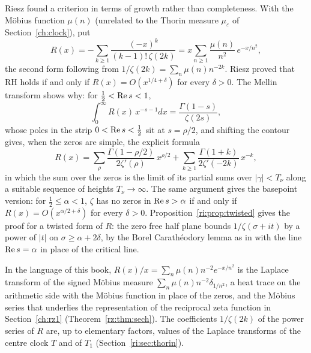 Riesz \cite{Riesz16} found a criterion in terms of growth rather than completeness. With the M\"obius function $\mu(n)$ (unrelated to the Thorin measure $\mu_\varepsilon$ of Section~\ref{ch:clock}), put
\begin{equation}\label{wr:eq:riesz}
R(x)=-\sum_{k\ge1}\frac{(-x)^k}{(k-1)!\,\zeta(2k)}=x\sum_{n\ge1}\frac{\mu(n)}{n^2}\,e^{-x/n^2},
\end{equation}
the second form following from $1/\zeta(2k)=\sum_n\mu(n)n^{-2k}$. Riesz proved that RH holds if and only if $R(x)=O(x^{1/4+\delta})$ for every $\delta>0$. The Mellin transform shows why: for $\frac12<\operatorname{Re} s<1$,
\begin{equation}\label{wr:eq:rieszmellin}
\int_0^\infty R(x)\,x^{-s-1}dx=\frac{\Gamma(1-s)}{\zeta(2s)},
\end{equation}
whose poles in the strip $0<\operatorname{Re} s<\frac12$ sit at $s=\rho/2$, and shifting the contour gives, when the zeros are simple, the explicit formula
\begin{equation}\label{wr:eq:rieszexplicit}
R(x)=\sum_\rho\frac{\Gamma(1-\rho/2)}{2\zeta'(\rho)}\,x^{\rho/2}+\sum_{k\ge1}\frac{\Gamma(1+k)}{2\zeta'(-2k)}\,x^{-k},
\end{equation}
in which the sum over the zeros is the limit of its partial sums over $|\gamma|<T_\nu$ along a suitable sequence of heights $T_\nu\to\infty$. The same argument gives the basepoint version: for $\frac12\le\alpha<1$, $\zeta$ has no zeros in $\operatorname{Re} s>\alpha$ if and only if $R(x)=O(x^{\alpha/2+\delta})$ for every $\delta>0$. Proposition~\ref{ri:prop:twisted} gives the proof for a twisted form of $R$: the zero free half plane bounds $1/\zeta(\sigma+it)$ by a power of $|t|$ on $\sigma\ge\alpha+2\delta$, by the Borel Carath\'eodory lemma as in \cite[Section 14.2]{Titchmarsh} with the line $\operatorname{Re} s=\alpha$ in place of the critical line.

In the language of this book, $R(x)/x=\sum_n\mu(n)n^{-2}e^{-x/n^2}$ is the Laplace transform of the signed M\"obius measure $\sum_n\mu(n)n^{-2}\delta_{1/n^2}$, a heat trace on the arithmetic side with the M\"obius function in place of the zeros, and the M\"obius series that underlies the representation of the reciprocal zeta function in Section~\ref{ch:rz1} (Theorem~\ref{rz:thm:sech}). The coefficients $1/\zeta(2k)$ of the power series of $R$ are, up to elementary factors, values of the Laplace transforms of the centre clock $T$ and of $T_1$ (Section~\ref{ri:sec:thorin}).

